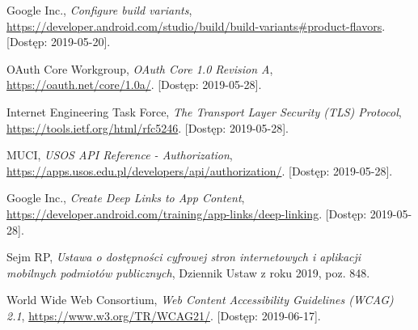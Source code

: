 \documentclass{pracamgr}
\begin{document}
\begin{thebibliography}{99}
 Google Inc., \textit{Configure build variants}, \url{https://developer.android.com/studio/build/build-variants#product-flavors}. [Dostęp: 2019-05-20].

 OAuth Core Workgroup, \textit{OAuth Core 1.0 Revision A}, \url{https://oauth.net/core/1.0a/}. [Dostęp: 2019-05-28].

 Internet Engineering Task Force, \textit{The Transport Layer Security (TLS) Protocol}, \url{https://tools.ietf.org/html/rfc5246}. [Dostęp: 2019-05-28].

 MUCI, \textit{USOS API Reference - Authorization}, \url{https://apps.usos.edu.pl/developers/api/authorization/}. [Dostęp: 2019-05-28].

 Google Inc., \textit{Create Deep Links to App Content}, \url{https://developer.android.com/training/app-links/deep-linking}. [Dostęp: 2019-05-28].

 Sejm RP, \textit{Ustawa o dostępności cyfrowej stron internetowych i aplikacji mobilnych podmiotów publicznych}, Dziennik Ustaw z roku 2019, poz. 848.

 World Wide Web Consortium, \textit{Web Content Accessibility Guidelines (WCAG) 2.1},
\url{https://www.w3.org/TR/WCAG21/}. [Dostęp: 2019-06-17].

\end{thebibliography}
\end{document}
